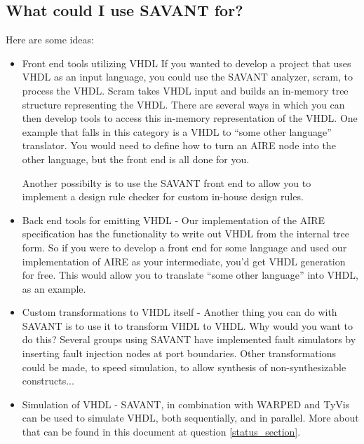 \documentclass[11pt]{article}
\begin{document}
\subsection{What could I use SAVANT for?}
Here are some ideas:
\begin{itemize}
\item{Front end tools utilizing VHDL}  If you wanted to develop a
project that uses VHDL as an input language, you could use the SAVANT
analyzer, scram, to process the VHDL.  Scram takes VHDL input and builds an
in-memory tree structure representing the VHDL.  There are several ways in
which you can then develop tools to access this in-memory representation of
the VHDL.  One example that falls in this category is a VHDL to ``some
other language'' translator.  You would need to define how to turn an AIRE
node into the other language, but the front end is all done for you.

Another possibilty is to use the SAVANT front end to allow you to implement
a design rule checker for custom in-house design rules.

\item{Back end tools for emitting VHDL} - Our implementation of the AIRE
specification has the functionality to write out VHDL from the internal
tree form. So if you were to develop a front end for some language and
used our implementation of AIRE as your intermediate, you'd get VHDL
generation for free.  This would allow you to translate ``some other
language'' into VHDL, as an example.

\item{Custom transformations to VHDL itself} - Another thing you can do with
SAVANT is to use it to transform VHDL to VHDL.  Why would you want to do
this?  Several groups using SAVANT have implemented fault simulators by
inserting fault injection nodes at port boundaries.  Other transformations
could be made, to speed simulation, to allow synthesis of non-synthesizable
constructs... 

\item{Simulation of VHDL} - SAVANT, in combination with {\sc WARPED} and
TyVis can be used to simulate VHDL, both sequentially, and in parallel.
More about that can be found in this document at question
\ref{status_section}.

\end{itemize}
\end{document}
